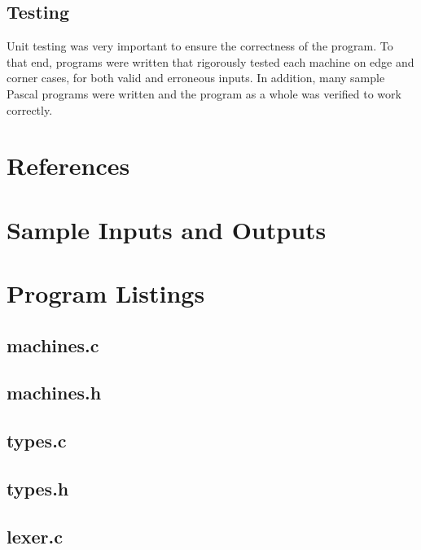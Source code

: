 \documentclass[titlepage]{article}
\begin{document}
		\subsection{Testing}
			Unit testing was very important to ensure the correctness of the program. To that end, programs were written that rigorously tested each machine on edge and corner cases, for both valid and erroneous inputs. In addition, many sample Pascal programs were written and the program as a whole was verified to work correctly.
	\section{References}
	\appendix
	\section{Sample Inputs and Outputs}
		
		
	\section{Program Listings}
		\subsection{machines.c}
		
		\subsection{machines.h}
		
		\subsection{types.c}
		
		\subsection{types.h}
		
		\subsection{lexer.c}
		
\end{document}
